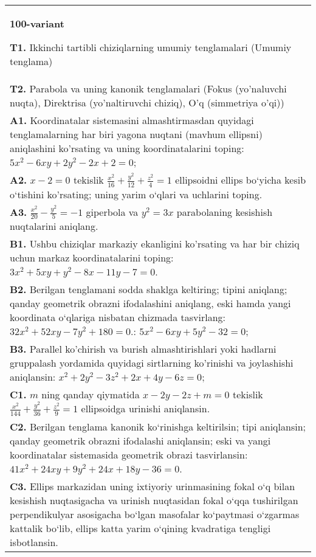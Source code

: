 \documentclass{article}
\begin{document}
\begin{tabular}{m{17cm}}
\textbf{100-variant}
\newline

\textbf{T1.} Ikkinchi tartibli chiziqlarning umumiy tenglamalari (Umumiy tenglama) \\
\textbf{T2.} Parabola va uning kanonik tenglamalari (Fokus (yo’naluvchi nuqta), Direktrisa (yo’naltiruvchi chiziq), O’q (simmetriya o’qi)) \\
\textbf{A1.} Koordinatalar sistemasini almashtirmasdan quyidagi tenglamalarning har biri yagona nuqtani (mavhum ellipsni) aniqlashini ko'rsating va uning koordinatalarini toping: $5 x^2-6 x y+2 y^2-2 x+2=0$; \\
\textbf{A2.} $x-2=0$ tekislik $\frac{x^2}{16}+\frac{y^2}{12}+\frac{z^2}{4}=1$ ellipsoidni ellips bo‘yicha kesib o‘tishini ko'rsating; uning yarim o‘qlari va uchlarini toping. \\
\textbf{A3.} $\frac{x^2}{20}-\frac{y^2}{5}=-1$ giperbola va $y^2=3 x$ parabolaning kesishish nuqtalarini aniqlang. \\
\textbf{B1.} Ushbu chiziqlar markaziy ekanligini ko'rsating va har bir chiziq uchun markaz koordinatalarini toping: $3x^2+5xy+y^2-8x-11y-7=0$. \\
\textbf{B2.} Berilgan tenglamani sodda shaklga keltiring; tipini aniqlang; qanday geometrik obrazni ifodalashini aniqlang, eski hamda yangi koordinata o‘qlariga nisbatan chizmada tasvirlang: $32x^2+52xy-7y^2+180=0$.: $5 x^2-6 x y+5 y^2-32=0$; \\
\textbf{B3.} Parallel ko'chirish va burish almashtirishlari yoki hadlarni gruppalash yordamida quyidagi sirtlarning ko'rinishi va joylashishi aniqlansin: $x^2+2 y^2-3 z^2+2 x+4 y-6 z=0$; \\
\textbf{C1.} $m$ ning qanday qiymatida $x-2 y-2 z+m=0$ tekislik $\frac{x^2}{144}+\frac{y^2}{36}+\frac{z^2}{9}=1$ ellipsoidga urinishi aniqlansin. \\
\textbf{C2.} Berilgan tenglama kanonik ko‘rinishga keltirilsin; tipi aniqlansin; qanday geometrik obrazni ifodalashi aniqlansin; eski va yangi koordinatalar sistemasida geometrik obrazi tasvirlansin: $41 x^2+24 x y+9 y^2+24 x+18 y-36=0$. \\
\textbf{C3.} Ellips markazidan uning ixtiyoriy urinmasining fokal o‘q bilan kesishish nuqtasigacha va urinish nuqtasidan fokal o‘qqa tushirilgan perpendikulyar asosigacha bo‘lgan masofalar ko‘paytmasi o‘zgarmas kattalik bo‘lib, ellips katta yarim o‘qining kvadratiga tengligi isbotlansin. \\

\end{tabular}
\vspace{1cm}
\end{document}

